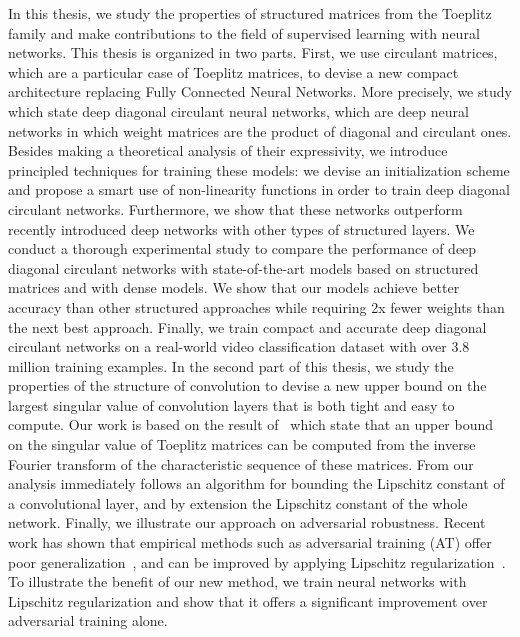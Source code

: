 In this thesis, we study the properties of structured matrices from the Toeplitz family and make contributions to the field of supervised learning with neural networks.
This thesis is organized in two parts.
First, we use circulant matrices, which are a particular case of Toeplitz matrices, to devise a new compact architecture replacing Fully Connected Neural Networks.
More precisely, we study which state deep diagonal circulant neural networks, which are deep neural networks in which weight matrices are the product of diagonal and circulant ones.
Besides making a theoretical analysis of their expressivity, we introduce principled techniques for training these models: we devise an initialization scheme and propose a smart use of non-linearity functions in order to train deep diagonal circulant networks. 
Furthermore, we show that these networks outperform recently introduced deep networks with other types of structured layers.
We conduct a thorough experimental study to compare the performance of deep diagonal circulant networks with state-of-the-art models based on structured matrices and with dense models.
We show that our models achieve better accuracy than other structured approaches while requiring 2x fewer weights than the next best approach.
Finally, we train compact and accurate deep diagonal circulant networks on a real-world video classification dataset with over 3.8 million training examples. 
In the second part of this thesis, we study the properties of the structure of convolution to devise a new upper bound on the largest singular value of convolution layers that is both tight and easy to compute. 
Our work is based on the result of~\citet{gray2006toeplitz} which state that an upper bound on the singular value of Toeplitz matrices can be computed from the inverse Fourier transform of the characteristic sequence of these matrices.
From our analysis immediately follows an algorithm for bounding the Lipschitz constant of a convolutional layer, and by extension the Lipschitz constant of the whole network.
Finally, we illustrate our approach on adversarial robustness. 
Recent work has shown that empirical methods such as adversarial training (AT) offer poor generalization~\cite{schmidt2018adversarially}, and can be improved by applying Lipschitz regularization~\cite{farnia2018generalizable}.
To illustrate the benefit of our new method, we train neural networks with Lipschitz regularization and show that it offers a significant improvement over adversarial training alone.





